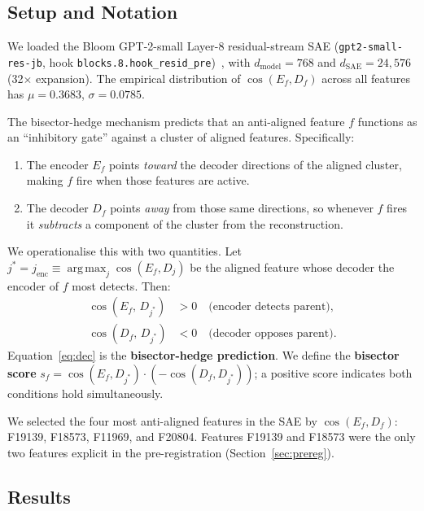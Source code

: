 \documentclass[11pt,a4paper]{article}
\newcommand{\Ef}{E_f}
\newcommand{\Df}{D_f}
\newcommand{\jenc}{j_{\mathrm{enc}}}
\DeclareMathOperator*{\argmax}{arg\,max}
\begin{document}
\subsection{Setup and Notation}

We loaded the Bloom GPT-2-small Layer-8 residual-stream SAE
(\texttt{gpt2-small-res-jb}, hook \texttt{blocks.8.hook\_resid\_pre})~\citep{bloom2024},
with $d_{\mathrm{model}}{=}768$ and $d_{\mathrm{SAE}}{=}24{,}576$ (32$\times$ expansion).
The empirical distribution of $\cos(\Ef, \Df)$ across all features has
$\mu{=}0.3683$, $\sigma{=}0.0785$.

The bisector-hedge mechanism predicts that an anti-aligned feature $f$ functions as
an ``inhibitory gate'' against a cluster of aligned features.  Specifically:
\begin{enumerate}[noitemsep]
  \item The encoder $\Ef$ points \emph{toward} the decoder directions of the aligned
    cluster, making $f$ fire when those features are active.
  \item The decoder $\Df$ points \emph{away} from those same directions, so whenever
    $f$ fires it \emph{subtracts} a component of the cluster from the reconstruction.
\end{enumerate}
We operationalise this with two quantities.  Let
$j^* = \jenc \equiv \argmax_j \cos(\Ef, D_j)$ be the aligned feature whose decoder
the encoder of $f$ most detects.  Then:
\begin{align}
  \cos(\Ef,\, D_{j^*}) &> 0 \quad \text{(encoder detects parent)}, \label{eq:enc}\\
  \cos(\Df,\, D_{j^*}) &< 0 \quad \text{(decoder opposes parent)}. \label{eq:dec}
\end{align}
Equation~\eqref{eq:dec} is the \textbf{bisector-hedge prediction}.
We define the \textbf{bisector score}
$s_f = \cos(\Ef, D_{j^*}) \cdot (-\cos(\Df, D_{j^*}))$;
a positive score indicates both conditions hold simultaneously.

We selected the four most anti-aligned features in the SAE by $\cos(\Ef, \Df)$:
F19139, F18573, F11969, and F20804.  Features F19139 and F18573 were the only two
features explicit in the pre-registration (Section~\ref{sec:prereg}).

\subsection{Results}
\end{document}

